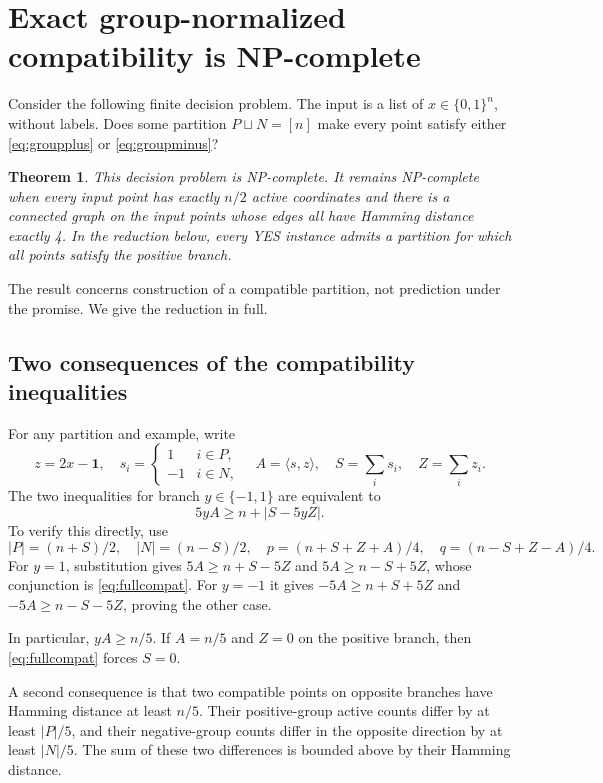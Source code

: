 \documentclass[11pt,a4paper]{article}
\newtheorem{theorem}{Theorem}
\theoremstyle{remark}
\newcommand{\ip}[2]{\langle #1,#2\rangle}
\newcommand{\1}{\mathbf 1}
\begin{document}
\section{Exact group-normalized compatibility is NP-complete}
\label{app:hardness}

Consider the following finite decision problem. The input is a list of
$x\in\{0,1\}^n$, without labels. Does some partition $P\sqcup N=[n]$ make every
point satisfy either \eqref{eq:groupplus} or \eqref{eq:groupminus}?

\begin{theorem}\label{thm:npcomplete}
This decision problem is NP-complete. It remains NP-complete when every input
point has exactly $n/2$ active coordinates and there is a connected graph on
the input points whose edges all have Hamming distance exactly 4.
In the reduction below, every YES instance admits a partition for which all
points satisfy the positive branch.
\end{theorem}

The result concerns construction of a compatible partition, not prediction
under the promise. We give the reduction in full.

\subsection{Two consequences of the compatibility inequalities}

For any partition and example, write
\[
 z=2x-\1,\quad
 s_i=\begin{cases}1&i\in P,\\-1&i\in N,\end{cases}
 \quad A=\ip{s}{z},\quad S=\sum_i s_i,\quad Z=\sum_i z_i.
\]
The two inequalities for branch $y\in\{-1,1\}$ are equivalent to
\begin{equation}\label{eq:fullcompat}
 5yA\ge n+|S-5yZ|.
\end{equation}
To verify this directly, use
\[
 |P|=(n+S)/2,\quad |N|=(n-S)/2,
 \quad p=(n+S+Z+A)/4,\quad q=(n-S+Z-A)/4.
\]
For $y=1$, substitution gives
$5A\ge n+S-5Z$ and $5A\ge n-S+5Z$, whose conjunction is
\eqref{eq:fullcompat}. For $y=-1$ it gives
$-5A\ge n+S+5Z$ and $-5A\ge n-S-5Z$, proving the other case.

In particular, $yA\ge n/5$. If $A=n/5$ and $Z=0$ on the positive branch,
then \eqref{eq:fullcompat} forces $S=0$.

A second consequence is that two compatible points on opposite branches
have Hamming distance at least $n/5$. Their positive-group active counts
differ by at least $|P|/5$, and their negative-group counts differ in the
opposite direction by at least $|N|/5$. The sum of these two differences is
bounded above by their Hamming distance.
\end{document}
